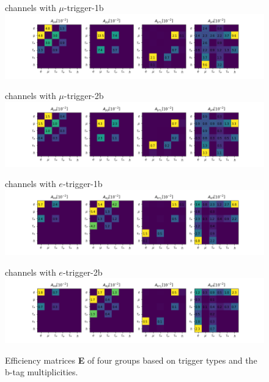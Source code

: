 

\begin{figure}[ht]
    \centering
    channels with $\mu$-trigger-1b \\
    \includegraphics[width=\textwidth]{chapters/Analysis/sectionStatisticalAnalysis/figures/acc_mu1b.png}
    
    channels with $\mu$-trigger-2b \\
    \includegraphics[width=\textwidth]{chapters/Analysis/sectionStatisticalAnalysis/figures/acc_mu2b.png}
    
    channels with $e$-trigger-1b \\
    \includegraphics[width=\textwidth]{chapters/Analysis/sectionStatisticalAnalysis/figures/acc_e1b.png}
    
    channels with $e$-trigger-2b \\
    \includegraphics[width=\textwidth]{chapters/Analysis/sectionStatisticalAnalysis/figures/acc_e2b.png}
    
    \caption{ Efficiency matrices \textbf{E} of four groups based on trigger types and the b-tag multiplicities. }
    \label{fig:efficencyMatrix}
\end{figure}





